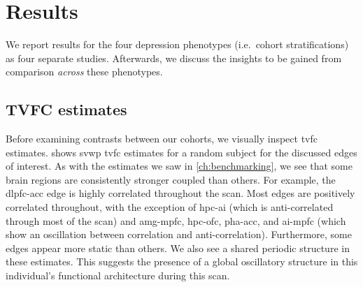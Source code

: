 \clearpage
\section{Results}
\label{sec:ukb-results}

We report results for the four depression phenotypes (i.e.~cohort stratifications) as four separate studies.
Afterwards, we discuss the insights to be gained from comparison \emph{across} these phenotypes.

\subsection{TVFC estimates}

Before examining contrasts between our cohorts, we visually inspect \gls{tvfc} estimates.
 shows \gls{svwp} \gls{tvfc} estimates for a random subject for the discussed edges of interest.
%
As with the estimates we saw in \cref{ch:benchmarking}, we see that some brain regions are consistently stronger coupled than others.
For example, the \gls{dlpfc}-\gls{acc} edge is highly correlated throughout the scan.
Most edges are positively correlated throughout, with the exception of \gls{hpc}-\gls{ai} (which is anti-correlated through most of the scan) and \gls{amg}-\gls{mpfc}, \gls{hpc}-\gls{ofc}, \gls{pha}-\gls{acc}, and \gls{ai}-\gls{mpfc} (which show an oscillation between correlation and anti-correlation).
Furthermore, some edges appear more static than others.
We also see a shared periodic structure in these estimates.
This suggests the presence of a global oscillatory structure in this individual's functional architecture during this scan.


